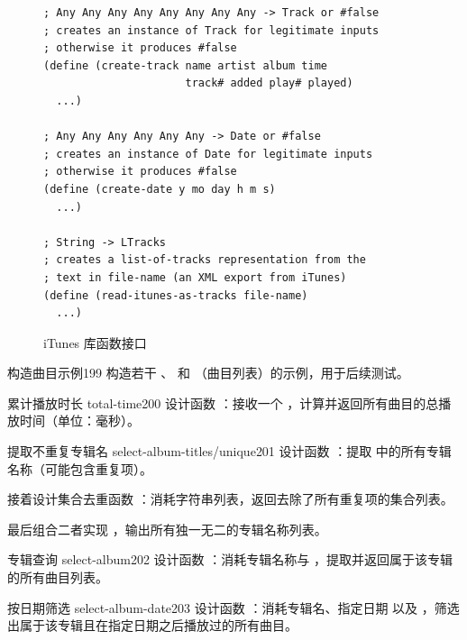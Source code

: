 \begin{figure}[htbp]
  \centering
\begin{lstlisting}[language=BSL]
; Any Any Any Any Any Any Any Any -> Track or #false
; creates an instance of Track for legitimate inputs
; otherwise it produces #false
(define (create-track name artist album time
                      track# added play# played)
  ...)

; Any Any Any Any Any Any -> Date or #false
; creates an instance of Date for legitimate inputs
; otherwise it produces #false
(define (create-date y mo day h m s)
  ...)

; String -> LTracks
; creates a list-of-tracks representation from the
; text in file-name (an XML export from iTunes)
(define (read-itunes-as-tracks file-name)
  ...)
\end{lstlisting}
  \caption{iTunes 库函数接口}
  \label{fig:itunes_functions}
\end{figure}

\begin{exercise}{构造曲目示例}{199}
构造若干 、 和 （曲目列表）的示例，用于后续测试。
\end{exercise}

\begin{exercise}{累计播放时长 total-time}{200}
设计函数 ：接收一个 ，计算并返回所有曲目的总播放时间（单位：毫秒）。
\end{exercise}

\begin{exercise}{提取不重复专辑名 select-album-titles/unique}{201}
设计函数 ：提取  中的所有专辑名称（可能包含重复项）。

接着设计集合去重函数 ：消耗字符串列表，返回去除了所有重复项的集合列表。

最后组合二者实现 ，输出所有独一无二的专辑名称列表。
\end{exercise}

\begin{exercise}{专辑查询 select-album}{202}
设计函数 ：消耗专辑名称与 ，提取并返回属于该专辑的所有曲目列表。
\end{exercise}

\begin{exercise}{按日期筛选 select-album-date}{203}
设计函数 ：消耗专辑名、指定日期  以及 ，筛选出属于该专辑且在指定日期之后播放过的所有曲目。
\end{exercise}

